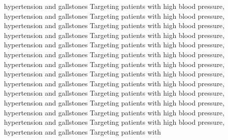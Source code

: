\documentclass{article}%
\begin{document}
{hypertension and gallstones Targeting patients with high blood pressure, hypertension and gallstones Targeting patients with high blood pressure, hypertension and gallstones Targeting patients with high blood pressure, hypertension and gallstones Targeting patients with high blood pressure, hypertension and gallstones Targeting patients with high blood pressure, hypertension and gallstones Targeting patients with high blood pressure, hypertension and gallstones Targeting patients with high blood pressure, hypertension and gallstones Targeting patients with high blood pressure, hypertension and gallstones Targeting patients with high blood pressure, hypertension and gallstones Targeting patients with high blood pressure, hypertension and gallstones Targeting patients with high blood pressure, hypertension and gallstones Targeting patients with high blood pressure, hypertension and gallstones Targeting patients with high blood pressure, hypertension and gallstones Targeting patients with}%
\end{document}
